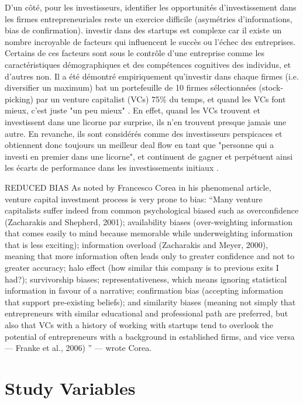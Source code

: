 \documentclass[11pt]{article}
\begin{document}
D'un côté, pour les investisseurs, identifier les opportunités d'investissement dans les firmes entrepreneuriales reste un exercice difficile (asymétries d'informations, bias de confirmation). investir dans des startups est complexe car il existe un nombre incroyable de facteurs qui influencent le succès ou l'échec des entreprises. Certains de ces facteurs sont sous le contrôle d'une entreprise comme les caractéristiques démographiques et des compétences cognitives des individus, et d'autres non. Il a été démontré empiriquement qu'investir dans chaque firmes (i.e. diversifier un maximum) bat un portefeuille de 10 firmes sélectionnées (stock-picking) par un venture capitalist (VCs) 75\% du temps, et quand les VCs font mieux, c'est juste "un peu mieux" \citep{othman2020angelistdata}. En effet, quand les VCs trouvent et investissent dans une licorne par surprise, ils n'en trouvent presque jamais une autre. En revanche, ils sont considérés comme des investisseurs perspicaces et obtiennent donc toujours un meilleur deal flow en tant que "personne qui a investi en premier dans une licorne", et continuent de gagner et perpétuent ainsi les écarts de performance dans les investissements initiaux \citep{nanda2020persistent}.


REDUCED BIAS
As noted by Francesco Corea in his phenomenal article, venture capital investment process is very prone to bias:
“Many venture capitalists suffer indeed from common psychological biased such as overconfidence (Zacharakis and Shepherd, 2001); availability biases (over-weighting information that comes easily to mind because memorable while underweighting information that is less exciting); information overload (Zacharakis and Meyer, 2000), meaning that more information often leads only to greater confidence and not to greater accuracy; halo effect (how similar this company is to previous exits I had?); survivorship biases; representativeness, which means ignoring statistical information in favour of a narrative; confirmation bias (accepting information that support pre-existing beliefs); and similarity biases (meaning not simply that entrepreneurs with similar educational and professional path are preferred, but also that VCs with a history of working with startups tend to overlook the potential of entrepreneurs with a background in established firms, and vice versa — Franke et al., 2006) ” — wrote Corea.

\section{Study Variables}
\end{document}

